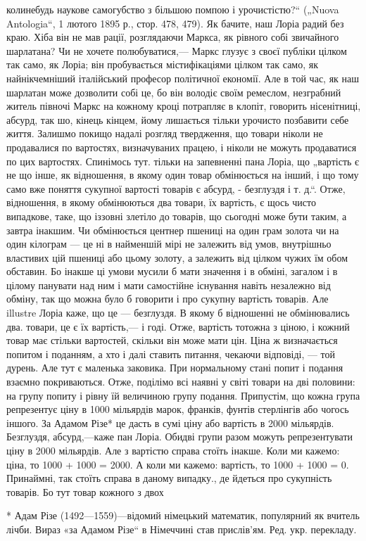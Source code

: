 \parcont{}  %
колинебудь наукове самогубство з більшою помпою і урочистістю?“  („Nuova Antologia“, 1 лютого
1895 р., стор. 478, 479). Як бачите, наш Лоріа радий без краю. Хіба він не мав рації, розглядаючи
Маркса, як рівного собі звичайного шарлатана?  Чи не хочете полюбуватися,— Маркс глузує з своєї
публіки цілком так само, як Лоріа; він пробувається містифікаціями цілком так само, як
найнікчемніший італійський професор політичної економії. Але в той час, як наш шарлатан може
дозволити собі це, бо він володіє своїм ремеслом, незграбний житель півночі Маркс на кожному
кроці потрапляє в клопіт, говорить нісенітниці, абсурд, так шо, кінець кінцем, йому лишається
тільки урочисто позбавити себе життя. Залишмо покищо надалі розгляд твердження, що товари ніколи
не продавалися по вартостях, визначуваних працею, і ніколи не можуть продаватися по цих
вартостях. Спинімось тут. тільки на запевненні пана Лоріа, що „вартість є не що інше, як
відношення, в якому один товар обмінюється на інший, і що тому само вже поняття сукупної вартості
товарів є абсурд, - безглуздя і т. д.“. Отже, відношення, в якому обмінюються два товари, їх
вартість, є щось чисто випадкове, таке, що іззовні злетіло до товарів, що сьогодні може бути
таким, а завтра інакшим. Чи обмінюється центнер пшениці на один грам золота чи на один кілограм —
це ні в найменшій мірі не залежить від умов, внутрішньо властивих цій пшениці або цьому золоту,
а залежить від цілком чужих їм обом обставин. Бо інакше ці умови мусили б мати значення і в
обміні, загалом і в цілому панувати над ним і мати самостійне існування навіть незалежно від
обміну, так що можна було б говорити і про сукупну вартість товарів. Але illustre  Лоріа каже, що
це — безглуздя. В якому б відношенні не обмінювались два. товари, це є їх вартість,— і годі.
Отже, вартість тотожна з ціною, і кожний товар має стільки вартостей, скільки він може мати цін.
Ціна ж визначається попитом і поданням, а хто і далі ставить питання, чекаючи відповіді, — той
дурень. Але тут є маленька заковика. При нормальному стані попит і подання взаємно покриваються.
Отже, поділімо всі наявні у світі товари на дві половини: на групу попиту і рівну їй величиною
групу подання. Припустім, що кожна група репрезентує ціну в 1000 мільярдів марок, франків,
фунтів стерлінгів або чогось іншого. За Адамом Різе* це дасть в сумі ціну або вартість в 2000
мільярдів. Безглуздя, абсурд,—каже пан Лоріа. Обидві групи разом можуть репрезентувати ціну в
2000 мільярдів. Але з вартістю справа стоїть інакше. Коли ми кажемо:  ціна, то 1000 + 1000 =
2000. А коли ми кажемо: вартість, то 1000 + 1000 = 0. Принаймні, так стоїть справа в даному
випадку., де йдеться про сукупність товарів. Бо тут товар кожного з двох

* Адам Різе (1492—1559)—відомий німецький математик, популярний як вчитель лічби. Вираз «за Адамом Різе“ в Німеччині став прислів’ям. Ред. укр. перекладу.
\parbreak{}

